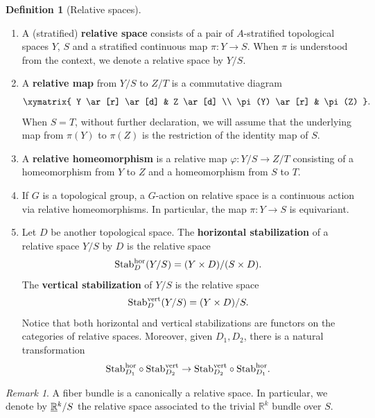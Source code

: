 \documentclass[reqno, 10pt]{amsart}
\numberwithin{equation}{section}
\numberwithin{equation}{section}
\theoremstyle{definition}
\newtheorem{defn}[thm]{Definition}
\theoremstyle{remark}
\newtheorem{rem}[thm]{Remark}
\newcommand{\beqn}{\begin{equation*}}
\newcommand{\eeqn}{\end{equation*}}
\newcommand{\mb}{\mathbb}
\newcommand{\uds}[1]{\underline{\smash{#1}}}
\begin{document}
\begin{defn}[Relative spaces]\label{defn_relative_space} \hfill   
\begin{enumerate}
\item A (stratified) {\bf relative space} consists of a pair of $A$-stratified topological spaces $Y$, $S$ and a stratified continuous map $\pi: Y \to S$. When $\pi$ is understood from the context, we denote a relative space by $Y/S$.
 
\item A {\bf relative map} from $Y/S$ to $Z/T$ is a commutative diagram
\beqn
\xymatrix{  Y \ar[r] \ar[d] & Z \ar[d] \\
            \pi(Y)  \ar[r]  & \pi(Z) }.
            \eeqn
When $S = T$, without further declaration, we will assume that the underlying map from $\pi(Y)$ to $\pi(Z)$ is the restriction of the identity map of $S$. 

\item A {\bf relative homeomorphism} is a relative map $\varphi: Y/S \to Z/T$ consisting of a homeomorphism from $Y$ to $Z$ and a homeomorphism from $S$ to $T$.

\item If $G$ is a topological group, a $G$-action on relative space is a continuous action via relative homeomorphisms. In particular, the map $\pi: Y \to S$ is equivariant.

\item Let $D$ be another topological space. The {\bf horizontal stabilization} of a relative space $Y/S$ by $D$ is the relative space 
\beqn
{\rm Stab}_D^{\rm hor}(Y/S) = (Y\times D)/(S \times D).
\eeqn
The {\bf vertical stabilization} of $Y/S$ is the relative space
\beqn
{\rm Stab}_D^{\rm vert}(Y/S) = (Y \times D)/S.
\eeqn
Notice that both horizontal and vertical stabilizations are functors on the categories of relative spaces. Moreover, given $D_1, D_2$, there is a natural transformation
\beqn
{\rm Stab}_{D_1}^{\rm hor} \circ {\rm Stab}_{D_2}^{\rm vert} \to {\rm Stab}_{D_2}^{\rm vert} \circ {\rm Stab}_{D_1}^{\rm hor}.
\eeqn

\end{enumerate}
\end{defn}

\begin{rem}
    A fiber bundle is a canonically a relative space. In particular, we denote by $\uds{\mb R}^k/S$ the relative space associated to the trivial ${\mb R}^k$ bundle over $S$.
\end{rem}
\end{document}
